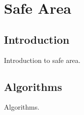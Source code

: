 \section{Safe Area}

\subsection{Introduction}
Introduction to safe area.
\subsection{Algorithms}
Algorithms.
